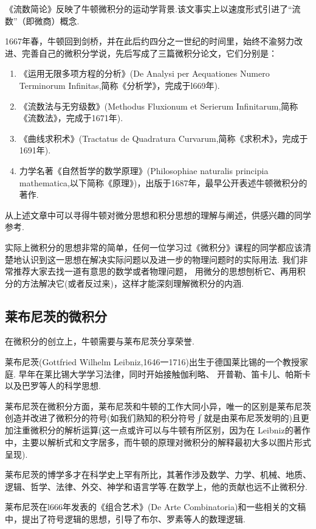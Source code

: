\documentclass{Math_Note}
\begin{document}
《流数简论》反映了牛顿微积分的运动学背景.该文事实上以速度形式引进了“流数”（即微商）概念.

1667年春，牛顿回到剑桥，并在此后约四分之一世纪的时间里，始终不渝努力改进、完善自己的微积分学说，先后写成了三篇微积分论文，它们分别是：

\begin{enumerate}
    \item 《运用无限多项方程的分析》(De Analysi per Aequationes Numero Terminorum Infinitas,简称《分析学》，完成于l669年). 
    \item 《流数法与无穷级数》(Methodus Fluxionum et Serierum Infinitarum,简称《流数法》，完成于1671年). 
    \item 《曲线求积术》(Tractatus de Quadratura Curvarum,简称《求积术》，完成于1691年).
    \item 力学名著《自然哲学的数学原理》(Philosophiae naturalis principia mathematica,以下简称《原理》)，出版于1687年，最早公开表述牛顿微积分的著作. 
\end{enumerate}

从上述文章中可以寻得牛顿对微分思想和积分思想的理解与阐述，供感兴趣的同学参考.

实际上微积分的思想非常的简单，任何一位学习过《微积分》课程的同学都应该清楚地认识到这一思想在解决实际问题以及进一步的物理问题时的实际用法. 我们非常推荐大家去找一道有意思的数学或者物理问题，
用微分的思想刨析它、再用积分的方法解决它(或者反过来)，这样才能深刻理解微积分的内涵. 

\subsection{莱布尼茨的微积分}
在微积分的创立上，牛顿需要与莱布尼茨分享荣誉. 

莱布尼茨(Gottfried Wilhelm Leibniz,1646一1716)出生于德国莱比锡的一个教授家庭. 早年在莱比锡大学学习法律，同时开始接触伽利略、
开普勒、笛卡儿、帕斯卡以及巴罗等人的科学思想. 

莱布尼茨在微积分方面，莱布尼茨和牛顿的工作大同小异，唯一的区别是莱布尼茨创造并改进了微积分的符号(如我们熟知的积分符号$\int$就是由莱布尼茨发明的)且更加注重微积分的解析运算(这一点或许可以与牛顿有所区别，因为在
Leibniz的著作中，主要以解析式和文字居多，而牛顿的原理对微积分的解释最初大多以图片形式呈现). 

莱布尼茨的博学多才在科学史上罕有所比，其著作涉及数学、力学、机械、地质、逻辑、哲学、法律、外交、神学和语言学等.在数学上，他的贡献也远不止微积分.

莱布尼茨在l666年发表的《组合艺术》(De Arte Combinatoria)和一些相关的文稿中，提出了符号逻辑的思想，引导了布尔、罗素等人的数理逻辑.
\end{document}
